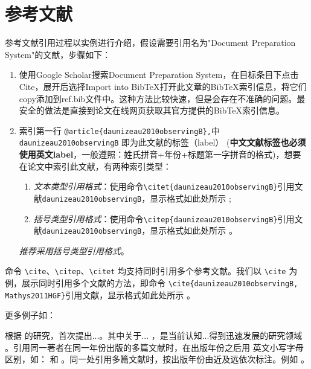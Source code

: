 \chapter{参考文献}\label{cha：referenceformat}

参考文献引用过程以实例进行介绍，假设需要引用名为"Document Preparation System"的文献，步骤如下：
\begin{enumerate} \small
\item 使用Google Scholar搜索Document Preparation System，在目标条目下点击Cite，展开后选择Import into BibTeX打开此文章的BibTeX索引信息，将它们copy添加到ref.bib文件中。这种方法比较快速，但是会存在不准确的问题。最安全的做法是直接到论文在线网页获取其官方提供的BibTeX索引信息。

\item 索引第一行 \verb|@article{daunizeau2010observingB},|中 \verb|daunizeau2010observingB| 即为此文献的标签（label） (\textbf{中文文献标签也必须使用英文label}，一般遵照：姓氏拼音+年份+标题第一字拼音的格式)，想要在论文中索引此文献，有两种索引类型：
\begin{enumerate}
\item \emph{文本类型引用格式}：使用命令\verb|\citet{daunizeau2010observingB}|引用文献\verb|daunizeau2010observingB|，显示格式如此处所示 \citet{daunizeau2010observingB}; 
\item \emph{括号类型引用格式}：使用命令\verb|\citep{daunizeau2010observingB}|引用文献\verb|daunizeau2010observingB|，显示格式如此处所示 \citep{daunizeau2010observingB}。
\end{enumerate}
\emph{推荐采用括号类型引用格式}。
\end{enumerate}


 命令 \verb|\cite|、\verb|\citep|、\verb|\citet| 均支持同时引用多个参考文献。我们以 \verb|\cite| 为例，展示同时引用多个文献的方法，即命令 \verb|\cite{daunizeau2010observingB, Mathys2011HGF}|引用文献，显示格式如此处所示 \cite{daunizeau2010observingB, Mathys2011HGF}。

更多例子如：

\citet{Mathys2011HGF} 根据 \citet{daunizeau2010observingA,daunizeau2010observingB} 的研究，首次提出...。其中关于... \citep{adolphs2003cognitive, YAU2023107799}，是当前认知...得到迅速发展的研究领域 \citep{NIPS2012_c399862d, goodfellow2016book}。引用同一著者在同一年份出版的多篇文献时，在出版年份之后用
英文小写字母区别，如：\citep{daunizeau2010observingA, daunizeau2010observingB} 和 \citet{daunizeau2010observingA, daunizeau2010observingB}。同一处引用多篇文献时，按出版年份由近及远依次标注。例如 \citep{beal2003VB,Friston_freeEnergy_2010, Mathys2011HGF, sutton2018reinforcement}。

